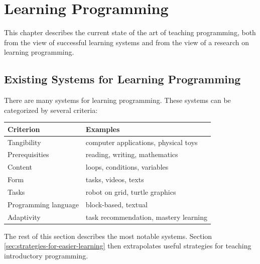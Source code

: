 \chapter{Learning Programming}
\label{chap:learning-programming}

This chapter describes the current state of the art of teaching programming, both from the view of successful learning systems and from the view of a research on learning programming.

\section{Existing Systems for Learning Programming}
\label{sec:existing-systems}

There are many systems for learning programming.
These systems can be categorized by several criteria:

\begin{table}[htb]
\begin{center}
\begin{tabular}{l l}
\toprule
Criterion & Examples \\
\midrule
Tangibility & computer applications, physical toys \\
Prerequisities & reading, writing, mathematics \\
Content & loops, conditions, variables \\
Form & tasks, videos, texts \\ %
Tasks & robot on grid, turtle graphics \\
Programming language & block-based, textual \\
Adaptivity & task recommendation, mastery learning \\
\bottomrule
\end{tabular}
\end{center}
\label{tbl:existing-systems-categorization}
\end{table}


The rest of this section describes the most notable systems.
Section \ref{sec:strategies-for-easier-learning} then extrapolates useful
strategies for teaching introductory programming.


